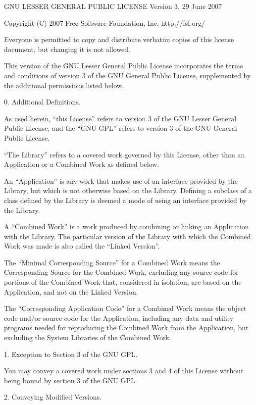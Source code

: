 \documentclass[letterpaper,10pt,english]{sphinxmanual}
\begin{document}
\begin{sphinxVerbatim}[commandchars=\\\{\}]
GNU LESSER GENERAL PUBLIC LICENSE
Version 3, 29 June 2007

Copyright (C) 2007 Free Software Foundation, Inc. \PYGZlt{}http://fsf.org/\PYGZgt{}

Everyone is permitted to copy and distribute verbatim copies of this license
document, but changing it is not allowed.

This version of the GNU Lesser General Public License incorporates the terms
and conditions of version 3 of the GNU General Public License, supplemented
by the additional permissions listed below.

0. Additional Definitions.

As used herein, “this License” refers to version 3 of the GNU Lesser General
Public License, and the “GNU GPL” refers to version 3 of the
GNU General Public License.

“The Library” refers to a covered work governed by this License, other than
an Application or a Combined Work as defined below.

An “Application” is any work that makes use of an interface provided by the
Library, but which is not otherwise based on the Library. Defining a subclass
of a class defined by the Library is deemed a mode of using an interface
provided by the Library.

A “Combined Work” is a work produced by combining or linking an Application
with the Library. The particular version of the Library with which the
Combined Work was made is also called the “Linked Version”.

The “Minimal Corresponding Source” for a Combined Work means the Corresponding
Source for the Combined Work, excluding any source code for portions of the
Combined Work that, considered in isolation, are based on the Application,
and not on the Linked Version.

The “Corresponding Application Code” for a Combined Work means the object code
and/or source code for the Application, including any data and utility programs
needed for reproducing the Combined Work from the Application, but excluding
the System Libraries of the Combined Work.

1. Exception to Section 3 of the GNU GPL.

You may convey a covered work under sections 3 and 4 of this License without
being bound by section 3 of the GNU GPL.

2. Conveying Modified Versions.


\end{sphinxVerbatim}
\end{document}
